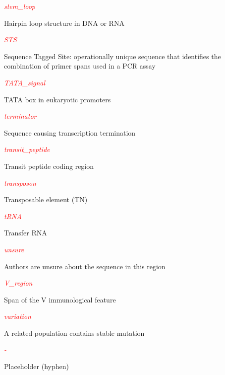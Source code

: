 \textcolor{red}{\textit{stem\_loop}}
\begin{adjustwidth}{1cm}{}
Hairpin loop structure in DNA or RNA
\end{adjustwidth}

\textcolor{red}{\textit{STS}}
\begin{adjustwidth}{1cm}{}
Sequence Tagged Site: operationally unique sequence that identifies the combination of primer spans used in a PCR assay 
\end{adjustwidth}

\textcolor{red}{\textit{TATA\_signal}}
\begin{adjustwidth}{1cm}{}
TATA box in eukaryotic promoters
\end{adjustwidth}

\textcolor{red}{\textit{terminator}}
\begin{adjustwidth}{1cm}{}
Sequence causing transcription termination
\end{adjustwidth}

\textcolor{red}{\textit{transit\_peptide}}
\begin{adjustwidth}{1cm}{}
Transit peptide coding region
\end{adjustwidth}

\textcolor{red}{\textit{transposon}}
\begin{adjustwidth}{1cm}{}
Transposable element (TN)
\end{adjustwidth}

\textcolor{red}{\textit{tRNA}}
\begin{adjustwidth}{1cm}{}
Transfer RNA
\end{adjustwidth}

\textcolor{red}{\textit{unsure}}
\begin{adjustwidth}{1cm}{}
Authors are unsure about the sequence in this region
\end{adjustwidth}

\textcolor{red}{\textit{V\_region}}
\begin{adjustwidth}{1cm}{}
Span of the V immunological feature
\end{adjustwidth}

\textcolor{red}{\textit{variation}}
\begin{adjustwidth}{1cm}{}
A related population contains stable mutation
\end{adjustwidth}

\textcolor{red}{\textit{-}}
\begin{adjustwidth}{1cm}{}
Placeholder (hyphen)
\end{adjustwidth}

